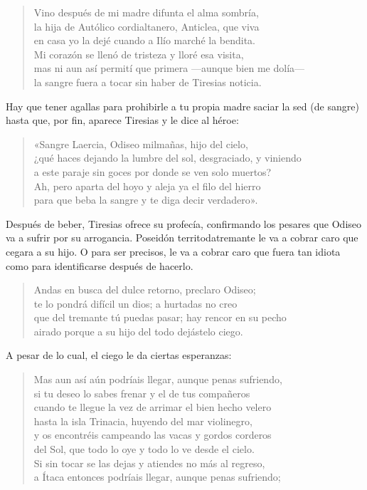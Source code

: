 \begin{verse}
Vino después de mi madre difunta el alma sombría,\\
la hija de Autólico cordialtanero, Anticlea, que viva\\
en casa yo la dejé cuando a Ilío marché la bendita.\\
Mi corazón se llenó de tristeza y lloré esa visita,\\
mas ni aun así permití que primera ---aunque bien me dolía---\\
la sangre fuera a tocar sin haber de Tiresias noticia.
\end{verse}

Hay que tener agallas para prohibirle a tu propia madre saciar la sed (de sangre) hasta que, por fin, aparece Tiresias y le dice al héroe:

\begin{verse}
«Sangre Laercia, Odiseo milmañas, hijo del cielo,\\
¿qué haces dejando la lumbre del sol, desgraciado, y viniendo\\
a este paraje sin goces por donde se ven solo muertos?\\
Ah, pero aparta del hoyo y aleja ya el filo del hierro\\
para que beba la sangre y te diga decir verdadero».
\end{verse}

Después de beber, Tiresias ofrece su profecía, confirmando los pesares que Odiseo va a sufrir por su arrogancia. Poseidón territodatremante le va a cobrar caro que cegara a su hijo. O para ser precisos, le va a cobrar caro que fuera tan idiota como para identificarse después de hacerlo.

\begin{verse}
Andas en busca del dulce retorno, preclaro Odiseo;\\
te lo pondrá difícil un dios; a hurtadas no creo\\
que del tremante tú puedas pasar; hay rencor en su pecho\\
airado porque a su hijo del todo dejástelo ciego.
\end{verse}

A pesar de lo cual, el ciego le da ciertas esperanzas:

\begin{verse}
Mas aun así aún podríais llegar, aunque penas sufriendo,\\
si tu deseo lo sabes frenar y el de tus compañeros\\
cuando te llegue la vez de arrimar el bien hecho velero\\
hasta la isla Trinacia, huyendo del mar violinegro,\\
y os encontréis campeando las vacas y gordos corderos\\
del Sol, que todo lo oye y todo lo ve desde el cielo.\\
Si sin tocar se las dejas y atiendes no más al regreso,\\
a Ítaca entonces podríais llegar, aunque penas sufriendo;
\end{verse}

